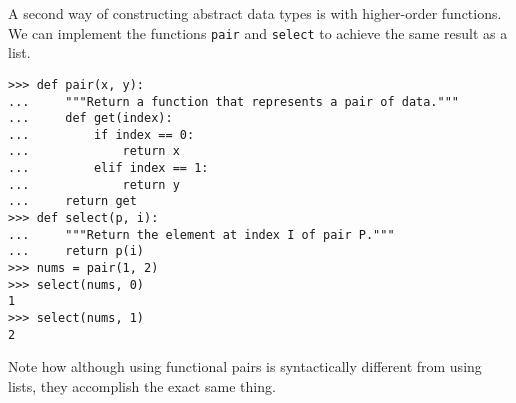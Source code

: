 A second way of constructing abstract data types is with higher-order
functions. We can implement the functions {\tt pair} and {\tt select} to achieve
the same result as a list.

\begin{lstlisting}
>>> def pair(x, y):
...     """Return a function that represents a pair of data."""
...     def get(index):
...         if index == 0:
...             return x
...         elif index == 1:
...             return y
...     return get
>>> def select(p, i):
...     """Return the element at index I of pair P."""
...     return p(i)
>>> nums = pair(1, 2)
>>> select(nums, 0)
1
>>> select(nums, 1)
2
\end{lstlisting}

Note how although using functional pairs is syntactically different from using
lists, they accomplish the exact same thing.

